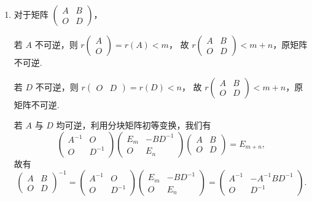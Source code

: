 \documentclass[UTF8,12pt,a4paper,fontset=fandol]{ctexart}
\begin{document}
\begin{solve}
\begin{enumerate}
                \item 对于矩阵 $\begin{pmatrix}
                        A & B \\ O & D
                    \end{pmatrix}$，

                    若 $A$ 不可逆，则 $r\begin{pmatrix} A \\ O \end{pmatrix} = r(A) < m$，
                    故 $r\begin{pmatrix} A & B \\ O & D \end{pmatrix} < m+n$，原矩阵不可逆.

                    若 $D$ 不可逆，则 $r\begin{pmatrix} O & D \end{pmatrix} = r(D) < n$，
                    故 $r\begin{pmatrix} A & B \\ O & D \end{pmatrix} < m+n$，原矩阵不可逆.

                    若 $A$ 与 $D$ 均可逆，利用分块矩阵初等变换，我们有
                    \[
                        \begin{pmatrix}
                            A^{-1} & O \\ O & D^{-1}
                        \end{pmatrix} \begin{pmatrix}
                            E_m & -BD^{-1} \\ O & E_n
                        \end{pmatrix} \begin{pmatrix}
                            A & B \\ O & D
                        \end{pmatrix} = E_{m+n},
                    \]
                    故有
                    \[
                        \begin{pmatrix}
                            A & B \\ O & D
                        \end{pmatrix}^{-1} = \begin{pmatrix}
                            A^{-1} & O \\ O & D^{-1}
                        \end{pmatrix} \begin{pmatrix}
                            E_m & -BD^{-1} \\ O & E_n
                        \end{pmatrix} = \begin{pmatrix}
                            A^{-1} & -A^{-1}BD^{-1} \\ O & D^{-1}
                        \end{pmatrix}.
                    \]


\end{enumerate}
\end{solve}
\end{document}
